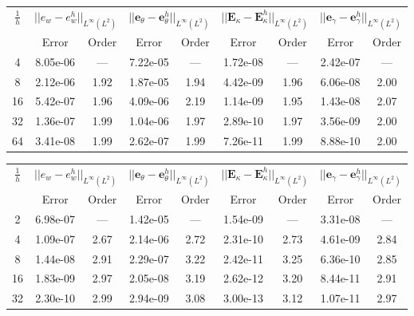 \begin{table}[hp]
	\centering
	\begin{tabular}{ccccccccc}
		\hline 
		\multirow{2}{*}{$\frac{1}{h}$} & \multicolumn{2}{c}{$||e_w - e_w^h||_{L^{\infty}(L^2)}$}    & \multicolumn{2}{c}{$||\bm{e}_\theta - \bm{e}_\theta^h||_{L^{\infty}(L^2)}$} & \multicolumn{2}{c}{$||\bm{E}_\kappa - \bm{E}_\kappa^h||_{L^{\infty}(L^2)}$} & \multicolumn{2}{c}{$||\bm{e}_\gamma - \bm{e}_\gamma^ h||_{L^{\infty}(L^2)}$}   \\ 
		& Error & Order  & Error & Order  & Error & Order  & Error & Order   \\ 
		\hline 
		4  & 8.05e-06 & ---  & 7.22e-05 & ---  & 1.72e-08 & ---  & 2.42e-07 & --- \\ 
		8  & 2.12e-06 & 1.92 & 1.87e-05 & 1.94 & 4.42e-09 & 1.96 & 6.06e-08 & 2.00\\ 
		16 & 5.42e-07 & 1.96 & 4.09e-06 & 2.19 & 1.14e-09 & 1.95 & 1.43e-08 & 2.07\\ 
		32 & 1.36e-07 & 1.99 & 1.04e-06 & 1.97 & 2.89e-10 & 1.97 & 3.56e-09 & 2.00\\ 
		64 & 3.41e-08 & 1.99 & 2.62e-07 & 1.99 & 7.26e-11 & 1.99 & 8.88e-10 & 2.00\\ 
		\hline 
	\end{tabular} 
	\captionsetup{width=0.95\linewidth}
	\vspace{1mm}
	\label{tab:resminBTJ_k2}
\end{table}

\begin{table}[hp]
	\centering
	\begin{tabular}{ccccccccc}
		\hline 
		\multirow{2}{*}{$\frac{1}{h}$} & \multicolumn{2}{c}{$||e_w - e_w^h||_{L^{\infty}(L^2)}$}    & \multicolumn{2}{c}{$||\bm{e}_\theta - \bm{e}_\theta^h||_{L^{\infty}(L^2)}$} & \multicolumn{2}{c}{$||\bm{E}_\kappa - \bm{E}_\kappa^h||_{L^{\infty}(L^2)}$} & \multicolumn{2}{c}{$||\bm{e}_\gamma - \bm{e}_\gamma^ h||_{L^{\infty}(L^2)}$}   \\ 
		& Error & Order  & Error & Order  & Error & Order  & Error & Order   \\ 
		\hline 
		2  & 6.98e-07 & ---  & 1.42e-05 & ---  & 1.54e-09 & ---  & 3.31e-08 & --- \\ 
		4  & 1.09e-07 & 2.67 & 2.14e-06 & 2.72 & 2.31e-10 & 2.73 & 4.61e-09 & 2.84\\ 
		8  & 1.44e-08 & 2.91 & 2.29e-07 & 3.22 & 2.42e-11 & 3.25 & 6.36e-10 & 2.85\\ 
		16 & 1.83e-09 & 2.97 & 2.05e-08 & 3.19 & 2.62e-12 & 3.20 & 8.44e-11 & 2.91\\ 
		32 & 2.30e-10 & 2.99 & 2.94e-09 & 3.08 & 3.00e-13 & 3.12 & 1.07e-11 & 2.97\\ 
		\hline 
	\end{tabular} 
	\captionsetup{width=0.95\linewidth}
	\vspace{1mm}
	\label{tab:resminBTJ_k3}
\end{table}


